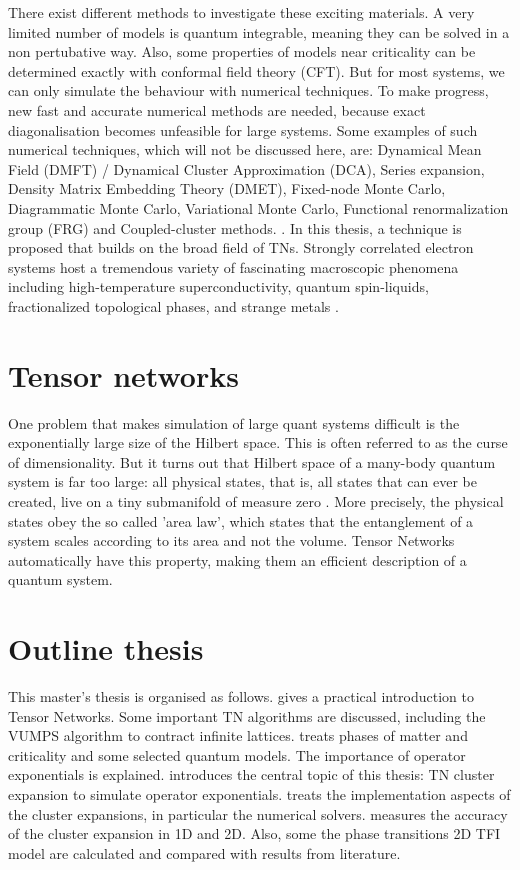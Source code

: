There exist different methods to investigate these exciting materials. A very limited number of models is quantum integrable, meaning they can be solved in a non pertubative way. Also, some properties of models near criticality can be determined exactly with conformal field theory (CFT). But for most systems, we can only simulate the behaviour with numerical techniques. To make progress, new fast and accurate numerical methods are needed, because exact diagonalisation becomes unfeasible for large systems. Some examples of such numerical techniques, which will not be discussed here, are: Dynamical Mean Field (DMFT) / Dynamical Cluster Approximation  (DCA), Series expansion, Density Matrix Embedding Theory (DMET), Fixed-node Monte Carlo, Diagrammatic Monte Carlo, Variational Monte Carlo, Functional renormalization group (FRG) and Coupled-cluster methods. \cite{Corboz}. In this thesis, a technique is proposed that builds on the broad field of \Glspl{TN}.
Strongly correlated electron systems host a tremendous variety of fascinating macroscopic phenomena including high-temperature superconductivity, quantum spin-liquids, fractionalized topological phases, and strange metals \cite{Alexandradinata2020}.

\section{Tensor networks}

One problem that makes simulation of large quant systems difficult is the exponentially large size of the Hilbert space.  This is often referred to as the curse of dimensionality. But it turns out that Hilbert space of a many-body quantum system is far too large: all physical states, that is, all states that can ever be created, live on a tiny submanifold of measure zero \cite{Cirac}. More precisely, the physical states obey the so called 'area law', which states that the entanglement of a system scales according to its area and not the volume. Tensor Networks automatically have this property, making them an efficient description of a quantum system.


\section{Outline thesis}

This master's thesis is organised as follows.  gives a practical introduction to Tensor Networks. Some important TN algorithms are discussed, including the VUMPS algorithm to contract infinite lattices.  treats phases of matter and criticality and some selected quantum models. The importance of operator exponentials is explained.  introduces the central topic of this thesis: TN cluster expansion to simulate operator exponentials.  treats the implementation aspects of the cluster expansions, in particular the numerical solvers.  measures the accuracy of the cluster expansion in 1D and 2D. Also, some the phase transitions 2D \Gls{TFI} model are calculated and compared with results from literature.